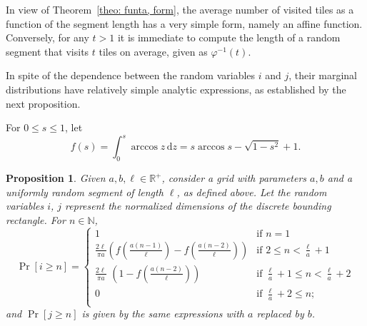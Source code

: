 \documentclass[12pt, a4paper]{article}
\newcommand{\diff}{\,\mathrm d}
\newcommand{\funta}{\varphi} %
\newcommand{\len}{\ell} %
\newcommand{\tiles}{t} %
\newcommand{\genvar}{s}
\newtheorem{proposition}{Proposition}%
\begin{document}
In view of Theorem~\ref{theo: funta, form}, the average number of visited tiles as a function of the segment length has a very simple form, namely an affine function. Conversely, for any $\tiles>1$ it is immediate to compute the length of a random segment that visits $\tiles$ tiles on average, given as $\funta^{-1}(\tiles)$.

In spite of the dependence between the random variables $i$ and $j$, their marginal distributions have relatively simple analytic expressions, as established by the next proposition.

For $0 \leq \genvar \leq 1$, let
\begin{equation}
\label{eq: f}
f(\genvar) = \int_0^\genvar \arccos z \diff z = \genvar \arccos \genvar - \sqrt{1-\genvar^2} + 1.
\end{equation}

\begin{proposition}
\label{prop: Pr i}
Given $a, b, \len \in \mathbb R^+$, consider a grid with parameters $a, b$ and a uniformly random segment of length $\len$, as defined above. Let the random variables $i$, $j$ represent the normalized dimensions of the discrete bounding rectangle. For $n \in \mathbb N$,
\begin{equation}
\label{eq: Pr i geq n}
\Pr[i \geq n] = \begin{cases}
\displaystyle
1 &\text{if\ \ } \displaystyle n =1 \\[1 mm]
\displaystyle
\frac{2\len}{\pi a} \left(f\left(\frac{a(n-1)}{\len}\right)-f\left(\frac{a(n-2)}{\len} \right)\right) &\text{if\ \ } \displaystyle 2 \leq n < \frac \len a + 1 \\[4 mm]
\displaystyle
\frac{2\len}{\pi a}\,\, \left(1 - f\left(\frac{a(n-2)}{\len}\right)\right) &\text{if\ \ } \displaystyle \frac\len a + 1 \leq n < \frac\len a+2 \\[3 mm]
\displaystyle
0 &\text{if\ \ } \displaystyle \frac \len a + 2 \leq  n; \\
\end{cases}
\end{equation}
and $\Pr[j \geq n]$ is given by the same expressions with $a$ replaced by $b$.
\end{proposition}
\end{document}
